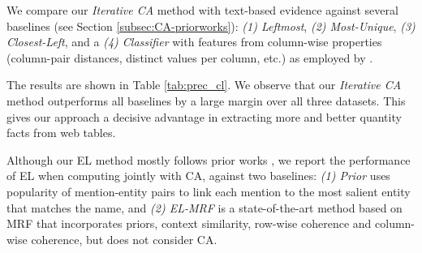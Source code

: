 


\vspace{0.1cm}
We compare our \textit{Iterative CA} method with text-based evidence
against several baselines (see Section \ref{subsec:CA-priorworks}): 
\textit{(1) Leftmost}, 
\textit{(2) Most-Unique}, 
\textit{(3) Closest-Left},
and a 
\textit{(4) Classifier} with features from column-wise
properties (column-pair distances, distinct values per column, etc.) as employed by \cite{DBLP:journals/pvldb/VenetisHMPSWMW11}.

The results are shown in Table \ref{tab:prec_cl}. 
We observe that 
our \textit{Iterative CA} method outperforms all
baselines by a large margin over all three datasets.
This gives our approach a decisive advantage in
extracting more and better quantity facts from web tables.
\vspace{0.1cm}


Although our EL method mostly follows prior works \cite{DBLP:conf/semweb/BhagavatulaND15, DBLP:conf/cikm/IbrahimRW16}, we report the
performance of EL when computing jointly with CA,
against two baselines: 
\textit{(1) Prior} uses 
popularity 
of mention-entity pairs to link each mention to the
most salient entity that matches the name, and
\textit{(2) EL-MRF} \cite{DBLP:conf/semweb/BhagavatulaND15}
is a state-of-the-art method based on MRF
that incorporates priors, context similarity, row-wise coherence and column-wise coherence, but does not consider CA.

